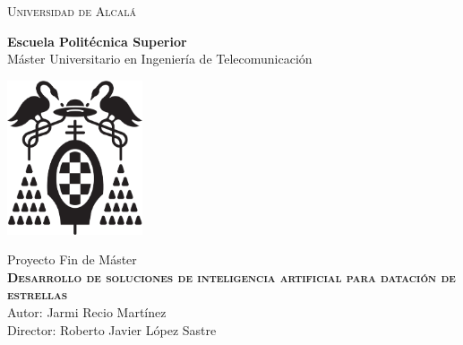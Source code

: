 
\begin{center}
\LARGE \textsc{Universidad de Alcalá}\\
\vspace{0.5cm}

\textbf{Escuela Politécnica Superior}\\

Máster Universitario en Ingeniería de Telecomunicación\\
\end{center}

\vspace{0.5cm}

\begin{center}
\includegraphics[width=4cm]{Figuras/LogoUAH.eps}\\
\end{center}


\begin{center}
\vspace{1cm}

\LARGE Proyecto Fin de Máster\\
\textbf{\Huge \textsc{{Desarrollo de soluciones de inteligencia artificial para datación de estrellas}}}\\
\vspace{0.5cm}
\large Autor: Jarmi Recio Martínez\\
Director: Roberto Javier López Sastre\\
\vspace{0.5cm}
\end{center}

